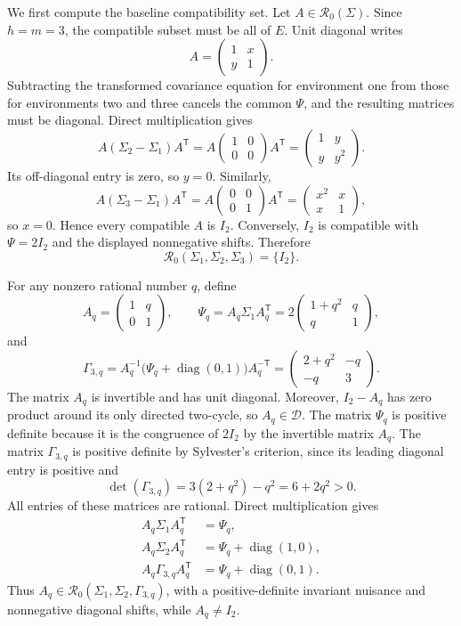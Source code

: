 We first compute the baseline compatibility set.  Let \(A\in\mathcal R_0(\Sigma)\).  Since \(h=m=3\), the compatible subset must be all of \(E\).  Unit diagonal writes
\[
 A=\begin{pmatrix}1&x\\y&1\end{pmatrix}.
\]
Subtracting the transformed covariance equation for environment one from those for environments two and three cancels the common \(\Psi\), and the resulting matrices must be diagonal.  Direct multiplication gives
\[
 A(\Sigma_2-\Sigma_1)A^{\mathsf T}
 =A\begin{pmatrix}1&0\\0&0\end{pmatrix}A^{\mathsf T}
 =\begin{pmatrix}1&y\\y&y^2\end{pmatrix}.
\]
Its off-diagonal entry is zero, so \(y=0\).  Similarly,
\[
 A(\Sigma_3-\Sigma_1)A^{\mathsf T}
 =A\begin{pmatrix}0&0\\0&1\end{pmatrix}A^{\mathsf T}
 =\begin{pmatrix}x^2&x\\x&1\end{pmatrix},
\]
so \(x=0\).  Hence every compatible \(A\) is \(I_2\).  Conversely, \(I_2\) is compatible with \(\Psi=2I_2\) and the displayed nonnegative shifts.  Therefore
\[
 \mathcal R_0(\Sigma_1,\Sigma_2,\Sigma_3)=\{I_2\}.
\]

For any nonzero rational number \(q\), define
\[
 A_q=\begin{pmatrix}1&q\\0&1\end{pmatrix},\qquad
 \Psi_q=A_q\Sigma_1A_q^{\mathsf T}
 =2\begin{pmatrix}1+q^2&q\\q&1\end{pmatrix},
\]
and
\[
 \Gamma_{3,q}
 =A_q^{-1}\bigl(\Psi_q+\operatorname{diag}(0,1)\bigr)A_q^{-\mathsf T}
 =\begin{pmatrix}2+q^2&-q\\-q&3\end{pmatrix}.
\]
The matrix \(A_q\) is invertible and has unit diagonal.  Moreover, \(I_2-A_q\) has zero product around its only directed two-cycle, so \(A_q\in\mathcal D\).  The matrix \(\Psi_q\) is positive definite because it is the congruence of \(2I_2\) by the invertible matrix \(A_q\).  The matrix \(\Gamma_{3,q}\) is positive definite by Sylvester's criterion, since its leading diagonal entry is positive and
\[
 \det(\Gamma_{3,q})=3(2+q^2)-q^2=6+2q^2>0.
\]
All entries of these matrices are rational.  Direct multiplication gives
\[
\begin{aligned}
 A_q\Sigma_1A_q^{\mathsf T}&=\Psi_q,\\
 A_q\Sigma_2A_q^{\mathsf T}&=\Psi_q+\operatorname{diag}(1,0),\\
 A_q\Gamma_{3,q}A_q^{\mathsf T}&=\Psi_q+\operatorname{diag}(0,1).
\end{aligned}
\]
Thus \(A_q\in\mathcal R_0(\Sigma_1,\Sigma_2,\Gamma_{3,q})\), with a positive-definite invariant nuisance and nonnegative diagonal shifts, while \(A_q\neq I_2\).

